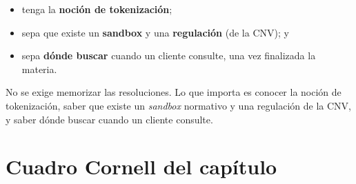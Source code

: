 \documentclass[12pt,oneside]{book}
\begin{document}
\begin{itemize}
    \item tenga la \textbf{noción de tokenización};
    \item sepa que existe un \textbf{sandbox} y una \textbf{regulación} (de la CNV); y
    \item sepa \textbf{dónde buscar} cuando un cliente consulte, una vez finalizada la materia.
\end{itemize}

\begin{important}
No se exige memorizar las resoluciones. Lo que importa es conocer la noción de tokenización, saber que existe un \textit{sandbox} normativo y una regulación de la CNV, y saber dónde buscar cuando un cliente consulte.
\end{important}

\section{Cuadro Cornell del capítulo}
\end{document}
